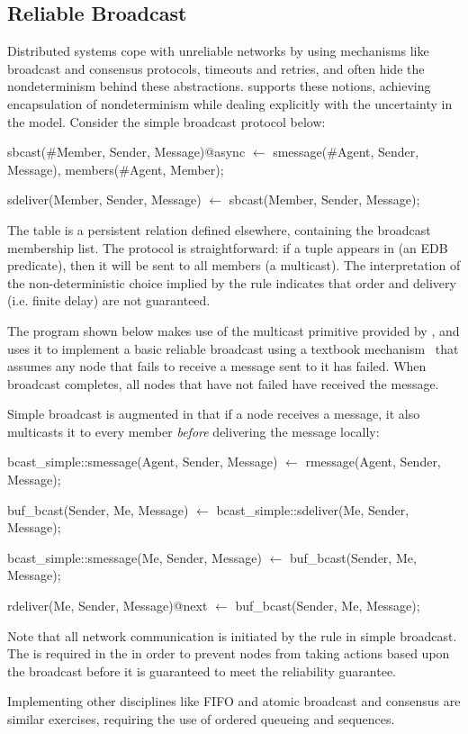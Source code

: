 \subsection{Reliable Broadcast}
Distributed systems cope with unreliable networks by using mechanisms like broadcast and consensus protocols, 
timeouts and retries, and often hide the nondeterminism behind these abstractions.  \lang supports these notions,
achieving encapsulation of nondeterminism while dealing explicitly with the uncertainty in the model.  Consider the simple
broadcast protocol below:

\begin{Dedalus}
sbcast(#Member, Sender, Message)@async \(\leftarrow\)
    smessage(#Agent, Sender, Message),
    members(#Agent, Member);

sdeliver(Member, Sender, Message) \(\leftarrow\)
    sbcast(Member, Sender, Message);

\end{Dedalus}

The table  is a persistent relation defined elsewhere, containing the broadcast 
membership list.  
The protocol is straightforward: if a tuple appears in  (an EDB predicate), then
it will be sent to all members (a multicast).  The interpretation of the non-deterministic choice implied by the
 rule indicates that order and delivery (i.e. finite delay) are not guaranteed.

The program shown below makes use of the
multicast primitive provided by , and uses it
to implement a basic reliable broadcast using a textbook
mechanism~\cite{mullender} that assumes any node that fails to receive
a message sent to it has failed.  When broadcast completes, all nodes
that have not failed have received the message.

Simple broadcast is augmented in that if a node receives a message, it 
also multicasts it to every member \emph{before} delivering the message locally:

\begin{Dedalus}
bcast_simple::smessage(Agent, Sender, Message)  \(\leftarrow\)
    rmessage(Agent, Sender, Message);

buf_bcast(Sender, Me, Message)  \(\leftarrow\)
    bcast_simple::sdeliver(Me, Sender, Message);

bcast_simple::smessage(Me, Sender, Message)  \(\leftarrow\)
    buf_bcast(Sender, Me, Message);

rdeliver(Me, Sender, Message)@next  \(\leftarrow\)
    buf_bcast(Sender, Me, Message);
\end{Dedalus}

Note that all network communication is initiated by the
 rule in simple broadcast.  The  is
required in the  in order to prevent nodes from
taking actions based upon the broadcast before it is guaranteed to
meet the reliability guarantee.

Implementing other disciplines like FIFO and atomic broadcast and
consensus are similar exercises, requiring the use of ordered queueing
and sequences.
